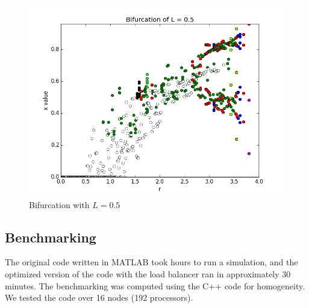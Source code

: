 \documentclass[12pt]{article}
\begin{document}
 \begin{figure}[H]
	\begin{center}
		\includegraphics[scale=0.5]{Bifurcation_L5}
\caption{Bifurcation with $L=0.5$}\label{lb_bif_5}
	\end{center}
\end{figure}

\subsection{Benchmarking}
\hspace{5mm} The original code written in MATLAB took hours to run a
simulation, and the optimized version of the code with the load
balancer ran in approximately 30 minutes. The benchmarking was
computed using the C++ code for homogeneity. We tested the code over
16 nodes (192 processors). 
\end{document}

